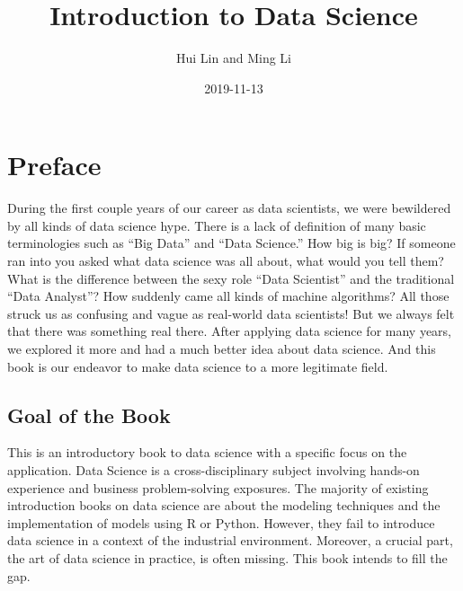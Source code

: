 \documentclass[12pt,]{krantz}
\title{Introduction to Data Science}
\author{Hui Lin and Ming Li}
\date{2019-11-13}
\begin{document}
\maketitle

\thispagestyle{empty}
\begin{center}
\end{center}

\setlength{\abovedisplayskip}{-5pt}
\setlength{\abovedisplayshortskip}{-5pt}

{
\hypersetup{linkcolor=}
\setcounter{tocdepth}{2}
\tableofcontents
}
\listoftables
\listoffigures
\hypertarget{preface}{%
\chapter*{Preface}\label{preface}}


During the first couple years of our career as data scientists, we were bewildered by all kinds of data science hype. There is a lack of definition of many basic terminologies such as ``Big Data'' and ``Data Science.'' How big is big? If someone ran into you asked what data science was all about, what would you tell them? What is the difference between the sexy role ``Data Scientist'' and the traditional ``Data Analyst''? How suddenly came all kinds of machine algorithms? All those struck us as confusing and vague as real-world data scientists! But we always felt that there was something real there. After applying data science for many years, we explored it more and had a much better idea about data science. And this book is our endeavor to make data science to a more legitimate field.

\hypertarget{goal-of-the-book}{%
\section*{Goal of the Book}\label{goal-of-the-book}}


This is an introductory book to data science with a specific focus on the application. Data Science is a cross-disciplinary subject involving hands-on experience and business problem-solving exposures. The majority of existing introduction books on data science are about the modeling techniques and the implementation of models using R or Python. However, they fail to introduce data science in a context of the industrial environment. Moreover, a crucial part, the art of data science in practice, is often missing. This book intends to fill the gap.
\end{document}
